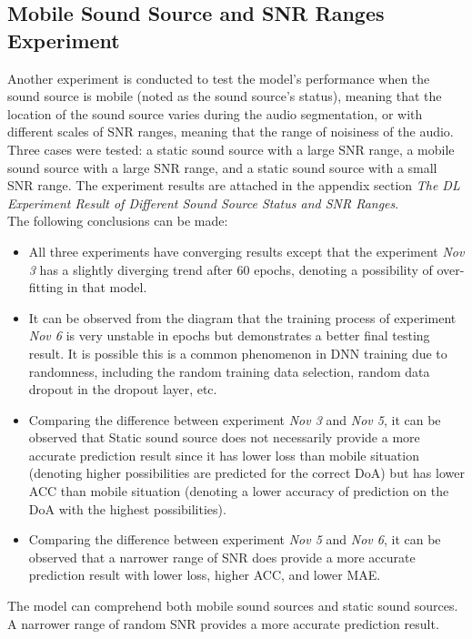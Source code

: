 \subsection*{Mobile Sound Source and SNR Ranges Experiment}
Another experiment is conducted to test the model's performance when the sound source is mobile (noted as the sound source's status), meaning that the location of the sound source varies during the audio segmentation, or with different scales of SNR ranges, meaning that the range of noisiness of the audio. \\
Three cases were tested: a static sound source with a large SNR range, a mobile sound source with a large SNR range, and a static sound source with a small SNR range. The experiment results are attached in the appendix section \textit{The DL Experiment Result of Different Sound Source Status and SNR Ranges}. \\
The following conclusions can be made:
\begin{itemize}
    \item All three experiments have converging results except that the experiment \textit{Nov 3} has a slightly diverging trend after \(60\) epochs, denoting a possibility of over-fitting in that model. 
    \item It can be observed from the diagram that the training process of experiment \textit{Nov 6} is very unstable in epochs but demonstrates a better final testing result. It is possible this is a common phenomenon in DNN training due to randomness, including the random training data selection, random data dropout in the dropout layer, etc. 
    \item Comparing the difference between experiment \textit{Nov 3} and \textit{Nov 5}, it can be observed that Static sound source does not necessarily provide a more accurate prediction result since it has lower loss than mobile situation (denoting higher possibilities are predicted for the correct DoA) but has lower ACC than mobile situation (denoting a lower accuracy of prediction on the DoA with the highest possibilities).
    \item Comparing the difference between experiment \textit{Nov 5} and \textit{Nov 6}, it can be observed that a narrower range of SNR does provide a more accurate prediction result with lower loss, higher ACC, and lower MAE.
\end{itemize}
The model can comprehend both mobile sound sources and static sound sources. A narrower range of random SNR provides a more accurate prediction result.

